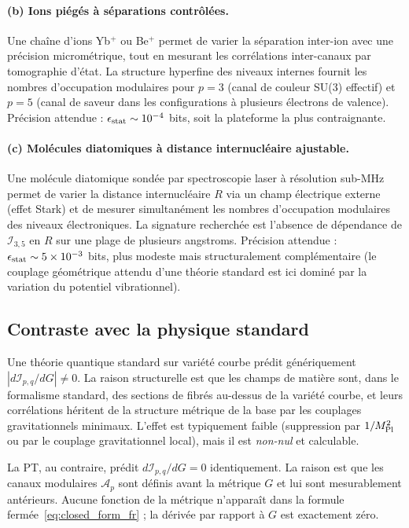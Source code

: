 \paragraph{(b) Ions piégés à séparations contrôlées.}
Une chaîne d'ions Yb$^+$ ou Be$^+$ permet de varier la séparation
inter-ion avec une précision micrométrique, tout en mesurant les
corrélations inter-canaux par tomographie d'état. La structure
hyperfine des niveaux internes fournit les nombres d'occupation
modulaires pour $p = 3$ (canal de couleur SU(3) effectif) et
$p = 5$ (canal de saveur dans les configurations à plusieurs
électrons de valence). Précision attendue : $\epsilon_{\rm stat}
\sim 10^{-4}$ bits, soit la plateforme la plus contraignante.

\paragraph{(c) Molécules diatomiques à distance internucléaire ajustable.}
Une molécule diatomique sondée par spectroscopie laser à
résolution sub-MHz permet de varier la distance internucléaire
$R$ via un champ électrique externe (effet Stark) et de mesurer
simultanément les nombres d'occupation modulaires des niveaux
électroniques. La signature recherchée est l'absence de
dépendance de $\mathcal{I}_{3,5}$ en $R$ sur une plage de
plusieurs angstroms. Précision attendue : $\epsilon_{\rm stat}
\sim 5 \times 10^{-3}$ bits, plus modeste mais structuralement
complémentaire (le couplage géométrique attendu d'une théorie
standard est ici dominé par la variation du potentiel
vibrationnel).

\subsection{Contraste avec la physique standard}
\label{ssec:qh1a_contraste}

Une théorie quantique standard sur variété courbe prédit
génériquement $|d\mathcal{I}_{p,q}/dG| \neq 0$. La raison
structurelle est que les champs de matière sont, dans le
formalisme standard, des sections de fibrés au-dessus de la
variété courbe, et leurs corrélations héritent de la structure
métrique de la base par les couplages gravitationnels minimaux.
L'effet est typiquement faible (suppression par $1/M_{\rm Pl}^2$
ou par le couplage gravitationnel local), mais il est
\emph{non-nul} et calculable.

La PT, au contraire, prédit $d\mathcal{I}_{p,q}/dG = 0$
identiquement. La raison est que les canaux modulaires
$\mathcal{A}_p$ sont définis avant la métrique $G$ et lui sont
mesurablement antérieurs. Aucune fonction de la métrique
n'apparaît dans la formule
fermée~\eqref{eq:closed_form_fr} ; la dérivée par rapport à $G$
est exactement zéro.


